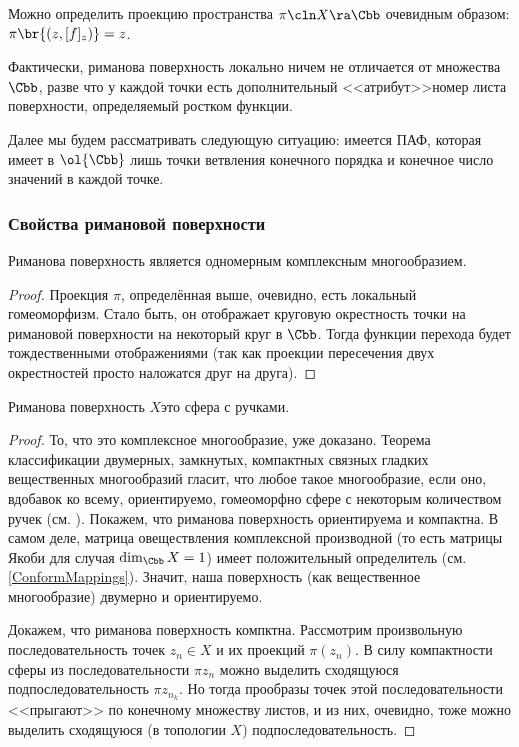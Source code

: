 \documentclass[a4paper]{article}
\begin{document}
Можно определить проекцию пространства $\pi\cln X \ra \Cbb$ очевидным образом: $\pi\br{(z,[f]_z)} = z$.

Фактически, риманова поверхность локально ничем не отличается от множества $\Cbb$, разве что у каждой точки
есть дополнительный <<атрибут>>\т номер листа поверхности, определяемый ростком функции.


Далее мы будем рассматривать следующую ситуацию: имеется ПАФ, которая имеет в $\ol{\Cbb}$ лишь точки
ветвления конечного порядка и конечное число значений в каждой точке.

\subsubsection{Свойства римановой поверхности}

\begin{theorem}
Риманова поверхность является одномерным комплексным многообразием.
\end{theorem}
\begin{proof}
Проекция $\pi$, определённая выше, очевидно, есть локальный гомеоморфизм. Стало быть, он отображает
круговую окрестность точки на римановой поверхности на некоторый круг в $\Cbb$. Тогда функции перехода
будет тождественными отображениями (так как проекции пересечения двух окрестностей просто наложатся друг на друга).
\end{proof}

\begin{imp}
Риманова поверхность $X$\т это сфера с ручками.
\end{imp}
\begin{proof}
То, что это комплексное многообразие, уже доказано. Теорема классификации двумерных, замкнутых, компактных
связных гладких вещественных многообразий гласит, что любое такое многообразие, если оно, вдобавок ко всему,
ориентируемо, гомеоморфно сфере с некоторым количеством ручек (см. \cite[гл.~4, \S~5, п.~3]{fomenko}). Покажем, что
риманова поверхность ориентируема и компактна. В самом деле, матрица овеществления комплексной производной (то
есть матрицы Якоби для случая $\dim_\Cbb X = 1$) имеет положительный определитель (см. \ref{ConformMappings}).
Значит, наша поверхность (как вещественное многообразие) двумерно и ориентируемо.

Докажем, что риманова поверхность компктна. Рассмотрим произвольную последовательность точек $z_n \in X$ и
их проекций $\pi(z_n)$. В силу компактности сферы из последовательности $\pi{z_n}$ можно выделить
сходящуюся подпоследовательность $\pi{z_{n_k}}$. Но тогда прообразы точек этой последовательности <<прыгают>> по
конечному множеству листов, и из них, очевидно, тоже можно выделить сходящуюся (в топологии $X$) подпоследовательность.
\end{proof}
\end{document}
